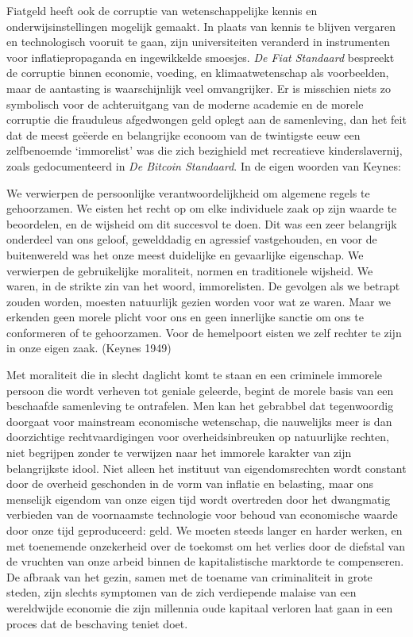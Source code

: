 \documentclass[
  a5paper,
  smalldemyvopaper,11pt,twoside,onecolumn,openright,extrafontsizes,
hidelinks]{memoir}
\begin{document}
Fiatgeld heeft ook de corruptie van wetenschappelijke kennis en
onderwijsinstellingen mogelijk gemaakt. In plaats van kennis te blijven
vergaren en technologisch vooruit te gaan, zijn universiteiten veranderd
in instrumenten voor inflatiepropaganda en ingewikkelde smoesjes.
\emph{De Fiat Standaard} bespreekt de corruptie binnen economie,
voeding, en klimaatwetenschap als voorbeelden, maar de aantasting is
waarschijnlijk veel omvangrijker. Er is misschien niets zo symbolisch
voor de achteruitgang van de moderne academie en de morele corruptie die
frauduleus afgedwongen geld oplegt aan de samenleving, dan het feit dat
de meest geëerde en belangrijke econoom van de twintigste eeuw een
zelfbenoemde `immorelist' was die zich bezighield met recreatieve
kinderslavernij, zoals gedocumenteerd in \emph{De Bitcoin Standaard}. In
de eigen woorden van Keynes:

We verwierpen de persoonlijke verantwoordelijkheid om algemene regels te
gehoorzamen. We eisten het recht op om elke individuele zaak op zijn
waarde te beoordelen, en de wijsheid om dit succesvol te doen. Dit was
een zeer belangrijk onderdeel van ons geloof, gewelddadig en agressief
vastgehouden, en voor de buitenwereld was het onze meest duidelijke en
gevaarlijke eigenschap. We verwierpen de gebruikelijke moraliteit,
normen en traditionele wijsheid. We waren, in de strikte zin van het
woord, immorelisten. De gevolgen als we betrapt zouden worden, moesten
natuurlijk gezien worden voor wat ze waren. Maar we erkenden geen morele
plicht voor ons en geen innerlijke sanctie om ons te conformeren of te
gehoorzamen. Voor de hemelpoort eisten we zelf rechter te zijn in onze
eigen zaak. (Keynes 1949)

Met moraliteit die in slecht daglicht komt te staan en een criminele
immorele persoon die wordt verheven tot geniale geleerde, begint de
morele basis van een beschaafde samenleving te ontrafelen. Men kan het
gebrabbel dat tegenwoordig doorgaat voor mainstream economische
wetenschap, die nauwelijks meer is dan doorzichtige rechtvaardigingen
voor overheidsinbreuken op natuurlijke rechten, niet begrijpen zonder te
verwijzen naar het immorele karakter van zijn belangrijkste idool. Niet
alleen het instituut van eigendomsrechten wordt constant door de
overheid geschonden in de vorm van inflatie en belasting, maar ons
menselijk eigendom van onze eigen tijd wordt overtreden door het
dwangmatig verbieden van de voornaamste technologie voor behoud van
economische waarde door onze tijd geproduceerd: geld. We moeten steeds
langer en harder werken, en met toenemende onzekerheid over de toekomst
om het verlies door de diefstal van de vruchten van onze arbeid binnen
de kapitalistische marktorde te compenseren. De afbraak van het gezin,
samen met de toename van criminaliteit in grote steden, zijn slechts
symptomen van de zich verdiepende malaise van een wereldwijde economie
die zijn millennia oude kapitaal verloren laat gaan in een proces dat de
beschaving teniet doet.
\end{document}
